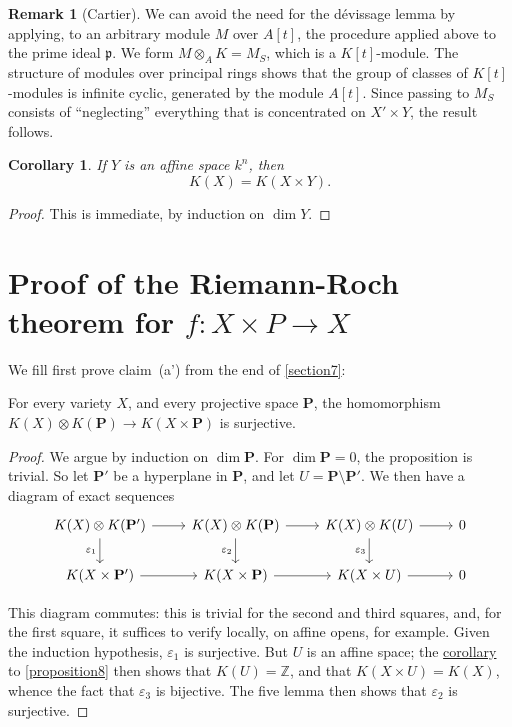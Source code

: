 \documentclass{article}
\theoremstyle{plain}
\newenvironment{proposition}[1]
    {\renewcommand\theinnercustomproposition{#1}\innercustomproposition}
    {\endinnercustomproposition}
\newtheorem*{corollary}{Corollary}
\theoremstyle{definition}
\newtheorem*{remark}{Remark}
\newcommand{\PP}{\mathbf{P}}
\newcommand{\oldpage}[1]{\marginpar{\footnotesize$\Big\vert$ \textit{p.~#1}}}
\begin{document}
\oldpage{118}
\begin{remark}[Cartier]
  We can avoid the need for the d\'{e}vissage lemma by applying, to an arbitrary module $M$ over $A[t]$, the procedure applied above to the prime ideal $\mathfrak{p}$.
  We form $M\otimes_A K=M_S$, which is a $K[t]$-module.
  The structure of modules over principal rings shows that the group of classes of $K[t]$-modules is infinite cyclic, generated by the module $A[t]$.
  Since passing to $M_S$ consists of ``neglecting'' everything that is concentrated on $X'\times Y$, the result follows.
\end{remark}

\begin{corollary}
\label{corollary-8}
  If $Y$ is an affine space $k^n$, then
  \[
    K(X) = K(X\times Y).
  \]
\end{corollary}

\begin{proof}
  This is immediate, by induction on $\dim Y$.
\end{proof}


\section{Proof of the Riemann-Roch theorem for $f\colon X\times P\to X$}
\label{section9}

We fill first prove claim~(a') from the end of \cref{section7}:

\begin{proposition}{9}
\label{proposition9}
  For every variety $X$, and every projective space $\PP$, the homomorphism $K(X)\otimes K(\PP)\to K(X\times \PP)$ is surjective.
\end{proposition}

\begin{proof}
  We argue by induction on $\dim\PP$.
  For $\dim\PP=0$, the proposition is trivial.
  So let $\PP'$ be a hyperplane in $\PP$, and let $U=\PP\setminus\PP'$.
  We then have a diagram of exact sequences
  \[
    \begin{tikzcd}
      K(X)\otimes K(\PP') \rar \dar[swap,"\varepsilon_1"]
      & K(X)\otimes K(\PP) \rar \dar[swap,"\varepsilon_2"]
      & K(X)\otimes K(U) \rar \dar[swap,"\varepsilon_3"]
      & 0
    \\K(X\times\PP') \rar
      & K(X\times\PP) \rar
      & K(X\times U) \rar
      & 0
    \end{tikzcd}
  \]

  This diagram commutes:
  this is trivial for the second and third squares, and, for the first square, it suffices to verify locally, on affine opens, for example.
  Given the induction hypothesis, $\varepsilon_1$ is surjective.
  But $U$ is an affine space;
  the \hyperref[corollary-8]{corollary} to \cref{proposition8} then shows that $K(U)=\mathbb{Z}$, and that $K(X\times U)=K(X)$, whence the fact that $\varepsilon_3$ is bijective.
  The five lemma then shows that $\varepsilon_2$ is surjective.
\end{proof}
\end{document}
